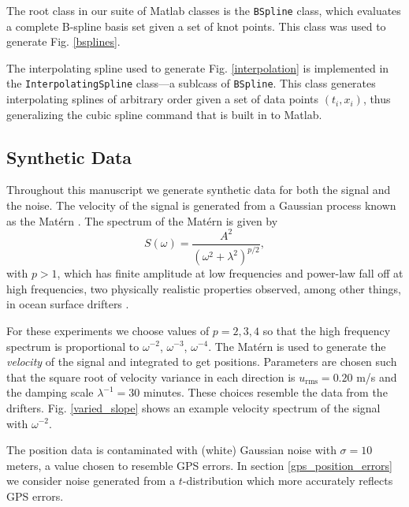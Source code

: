 \documentclass{ametsoc}
\begin{document}
The root class in our suite of Matlab classes is the \texttt{BSpline} class, which evaluates a complete B-spline basis set given a set of knot points. This class was used to generate Fig. \ref{bsplines}.

The interpolating spline used to generate Fig. \ref{interpolation} is implemented in the \texttt{InterpolatingSpline} class---a sublcass of \texttt{BSpline}. This class generates interpolating splines of arbitrary order given a set of data points $(t_i, x_i)$, thus generalizing the cubic spline command that is built in to Matlab.

\subsection{Synthetic Data}
\label{sec:synthetic_data}

Throughout this manuscript we generate synthetic data for both the signal and the noise. The velocity of the signal is generated from a Gaussian process known as the Mat\'ern \citep{lilly2017-npg}. The spectrum of the Mat\'ern is given by
\begin{equation}
S(\omega) = \frac{A^2}{(\omega^2 + \lambda^2)^{p/2}},
\end{equation}
with $p>1$, which has finite amplitude at low frequencies and power-law fall off at high frequencies, two physically realistic properties observed, among other things, in ocean surface drifters \citep{sykulski2016-jrssc}.


For these experiments we choose values of $p=2,3,4$ so that the high frequency spectrum is proportional to $\omega^{-2}$, $\omega^{-3}$, $\omega^{-4}$. The Mat\'ern is used to generate the \emph{velocity} of the signal and integrated to get positions. Parameters are chosen such that the square root of velocity variance in each direction is $u_{\textrm{rms}}=0.20$ m/s and the damping scale $\lambda^{-1}=30$ minutes. These choices resemble the data from the drifters. Fig. \ref{varied_slope} shows an example velocity spectrum of the signal with $\omega^{-2}$.

The position data is contaminated with (white) Gaussian noise with $\sigma=10$ meters, a value chosen to resemble GPS errors. In section \ref{gps_position_errors} we consider noise generated from a $t$-distribution which more accurately reflects GPS errors.
\end{document}
